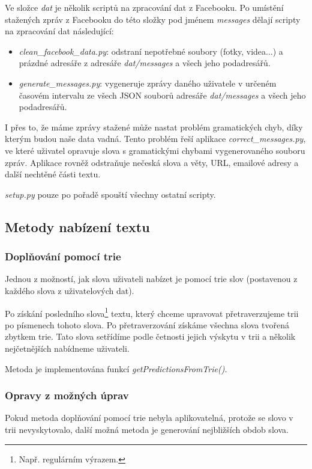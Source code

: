 \documentclass[a4paper, 12pt]{article}
\begin{document}
  Ve složce \textit{dat} je několik scriptů na zpracování dat z Facebooku. Po umístění stažených zpráv z Facebooku do této složky pod jménem \textit{messages} dělají scripty na zpracování dat následující:
  \begin{itemize}
    \item \textit{clean\_facebook\_data.py}: odstraní nepotřebné soubory (fotky, videa...) a prázdné adresáře z adresáře \textit{dat/messages} a všech jeho podadresářů.
    \item \textit{generate\_messages.py}: vygeneruje zprávy daného uživatele v určeném časovém intervalu ze všech JSON souborů adresáře \textit{dat/messages} a všech jeho podadresářů.
  \end{itemize}

  I přes to, že máme zprávy stažené může nastat problém gramatických chyb, díky kterým budou naše data vadná. Tento problém řeší aplikace \textit{correct\_messages.py}, ve které uživatel opravuje slova s gramatickými chybami vygenerovaného souboru zpráv. Aplikace rovněž odstraňuje nečeská slova a věty, URL, emailové adresy a další nechtěné části textu.

  \textit{setup.py} pouze po pořadě spouští všechny ostatní scripty.

  \subsection{Metody nabízení textu}

  \subsubsection{Doplňování pomocí trie}
  Jednou z možností, jak slova uživateli nabízet je pomocí trie slov (postavenou z každého slova z uživatelových dat).

  Po získání posledního slova\footnote{Např. regulárním výrazem.} textu, který chceme upravovat přetraverzujeme trii po písmenech tohoto slova. Po přetraverzování získáme všechna slova tvořená zbytkem trie. Tato slova setřídíme podle četnosti jejich výskytu v trii a několik nejčetnějších nabídneme uživateli.

  Metoda je implementována funkcí \textit{getPredictionsFromTrie()}.

  \subsubsection{Opravy z možných úprav}
  Pokud metoda doplňování pomocí trie nebyla aplikovatelná, protože se slovo v trii nevyskytovalo, další možná metoda je generování nejbližších obdob slova.
\end{document}

